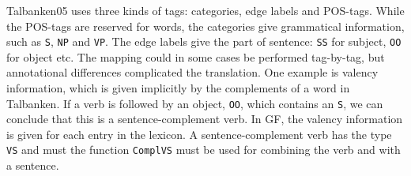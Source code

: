 \documentclass[runningheads,a4paper]{llncs}
\begin{document}
Talbanken05 uses three kinds of tags: categories, edge labels and POS-tags. 
While the POS-tags are reserved for words, the categories give grammatical information,
such as \verb|S|, \verb|NP| and \verb|VP|.
The edge labels give the part of sentence: \verb|SS| for subject, 
\verb|OO| for object etc. 
%
The mapping could in some cases be performed tag-by-tag, but annotational
differences complicated the translation.
One example is valency information, which is given implicitly by the complements
of a word in Talbanken. If a verb is followed by an object, \verb-OO-, which contains an
\verb-S-, we can conclude that this is a sentence-complement verb.
In GF, the valency information is given for each entry in the lexicon.
A sentence-complement verb has the type \verb-VS- and must the 
function \verb-ComplVS- must be used for combining the verb and with a 
sentence.

\end{document}
